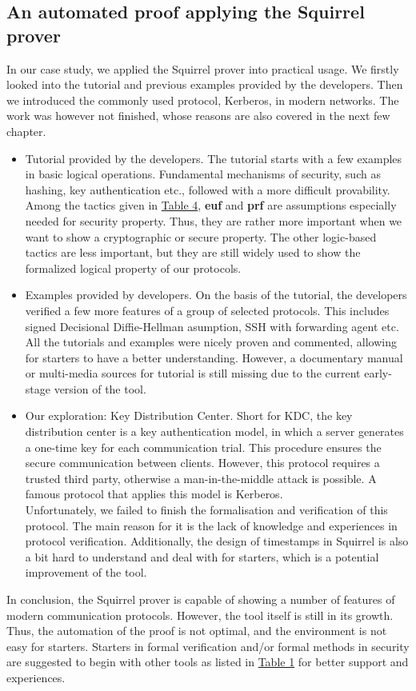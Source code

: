 \documentclass[conference]{IEEEtran}
\begin{document}
\subsection{An automated proof applying the Squirrel prover}
In our case study, we applied the Squirrel prover into practical usage. We firstly looked into the tutorial and previous examples  provided by the developers. Then we introduced the commonly used protocol, Kerberos, in modern networks. The work was however not finished, whose reasons are also covered in the next few chapter.
\begin{itemize}
    \item Tutorial provided by the developers. The tutorial starts with a few examples in basic logical operations. Fundamental mechanisms of security, such as hashing, key authentication etc., followed with a more difficult provability. Among the tactics given in \hyperref[table:4]{Table 4}, \textbf{euf} and \textbf{prf} are assumptions especially needed for security property. Thus, they are rather more important when we want to show a cryptographic or secure property. The other logic-based tactics are less important, but they are still widely used to show the formalized logical property of our protocols.
    \item Examples provided by developers. On the basis of the tutorial, the developers verified a few more
    features of a group of selected protocols. This includes signed Decisional Diffie-Hellman asumption, SSH with forwarding agent etc. All the tutorials and examples were nicely proven and commented, allowing for starters to have a better understanding. However, a documentary manual or multi-media sources for tutorial is still missing due to the current early-stage version of the tool.
    \item Our exploration: Key Distribution Center. Short for KDC, the key distribution center is a key authentication model, in which a server generates a one-time key for each communication trial. This procedure ensures the secure communication between clients. However, this protocol requires a trusted third party, otherwise a man-in-the-middle attack is possible. A famous protocol that applies this model is Kerberos.\cite{Kerberos} \\
    Unfortunately, we failed to finish the formalisation and verification of this protocol. The main reason for it is the lack of knowledge and experiences in protocol verification. Additionally, the design of timestamps in Squirrel is also a bit hard to understand and deal with for starters, which is a potential improvement of the tool. 
\end{itemize}
In conclusion, the Squirrel prover is capable of showing a number of features of modern communication protocols. However, the tool itself is still in its growth. Thus, the automation of the proof is not optimal, and the environment is not easy for starters. Starters in formal verification and/or formal methods in security are suggested to begin with other tools as listed in \hyperref[table:1]{Table 1} for better support and experiences.
\end{document}
